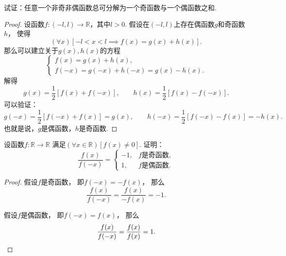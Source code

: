 \begin{example}\label{example:函数.任一函数可拆为奇偶函数之和}
试证：任意一个非奇非偶函数总可分解为一个奇函数与一个偶函数之和.
\begin{proof}
设函数\(f\colon(-l,l)\to\mathbb{R}\)，其中\(l>0\).
假设在\((-l,l)\)上存在偶函数\(g\)和奇函数\(h\)，
使得\begin{equation*}
	(\forall x)
	[-l<x<l \implies f(x) = g(x)+h(x)].
\end{equation*}
那么可以建立关于\(g(x),h(x)\)的方程\begin{equation*}
	\left\{ \begin{array}{l}
		f(x) = g(x) + h(x), \\
		f(-x) = g(-x) + h(-x) = g(x) - h(x).
	\end{array} \right.
\end{equation*}
解得\begin{equation*}
	g(x) = \frac12 [f(x) + f(-x)], \qquad
	h(x) = \frac12 [f(x) - f(-x)].
\end{equation*}
可以验证：\begin{equation*}
	g(-x) = \frac12 [f(-x) + f(x)] = g(x), \qquad
	h(-x) = \frac12 [f(-x) - f(x)] = -h(x).
\end{equation*}
也就是说，\(g\)是偶函数，\(h\)是奇函数.
\end{proof}
\end{example}

\begin{example}
设函数\(f\colon\mathbb{R}\to\mathbb{R}\)
满足\((\forall x\in\mathbb{R})[f(x)\neq0]\).
证明：\begin{equation*}
	\frac{f(x)}{f(-x)} = \left\{ \begin{array}{rl}
		-1, & \text{$f$是奇函数}, \\
		1, & \text{$f$是偶函数}.
	\end{array} \right.
\end{equation*}
\begin{proof}
假设\(f\)是奇函数，
即\(f(-x)=-f(x)\)，
那么\begin{equation*}
	\frac{f(x)}{f(-x)}
	=\frac{f(x)}{-f(x)}
	=-1.
\end{equation*}

假设\(f\)是偶函数，
即\(f(-x)=f(x)\)，
那么\begin{equation*}
	\frac{f(x)}{f(-x)}
	=\frac{f(x)}{f(x)}
	=1.
	\qedhere
\end{equation*}
\end{proof}
\end{example}

